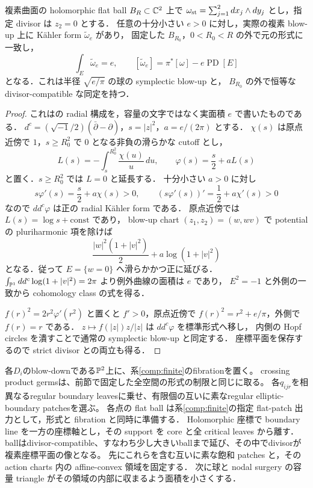 \begin{lemma}
\label{glue:area-normalized-blowup}
複素曲面の holomorphic flat ball $B_R\subset\mathbb C^2$ 上で
$\omega_{\rm st}=\sum_{j=1}^2dx_j\wedge dy_j$ とし，指定 divisor は $z_2=0$ とする．
任意の十分小さい $e>0$ に対し，実際の複素 blow-up 上に K\"ahler form $\widetilde\omega_e$ があり，
固定した $B_{R_0}$，$0<R_0<R$ の外で元の形式に一致し，
\[
 \int_E\widetilde\omega_e=e,\qquad
 [\widetilde\omega_e]=\pi^*[\omega]-e\operatorname{PD}[E]
\]
となる．これは半径 $\sqrt{e/\pi}$ の球の symplectic blow-up と，
$B_{R_0}$ の外で恒等な divisor-compatible な同定を持つ．
\end{lemma}
\begin{proof}
これは\cite[Lemmas 4.4--4.5, Proposition 4.6, Construction 4.7]{Fleming}の
radial 構成を，容量の文字ではなく実面積 $e$ で書いたものである．
$d^c=(\sqrt{-1}/2)(\bar\partial-\partial)$，$s=|z|^2$，$a=e/(2\pi)$ とする．
$\chi(s)$ は原点近傍で $1$，$s\ge R_0^2$ で $0$ となる非負の滑らかな cutoff とし，
\[
 L(s)=-\int_s^{R_0^2}\frac{\chi(u)}u\,du,
 \qquad \varphi(s)=\frac{s}{2}+aL(s)
\]
と置く．$s\ge R_0^2$ では $L=0$ と延長する．
十分小さい $a>0$ に対し
\[
 s\varphi'(s)=\frac{s}{2}+a\chi(s)>0,
 \qquad (s\varphi'(s))'=\frac12+a\chi'(s)>0
\]
なので $dd^c\varphi$ は正の radial K\"ahler form である．
原点近傍では $L(s)=\log s+\text{const}$ であり，
blow-up chart $(z_1,z_2)=(w,wv)$ で potential の pluriharmonic 項を除けば
\[
 \frac{|w|^2(1+|v|^2)}2+a\log(1+|v|^2)
\]
となる．従って $E=\{w=0\}$ へ滑らかかつ正に延びる．
$\int_{\mathbb P^1}dd^c\log(1+|v|^2)=2\pi$ より例外曲線の面積は $e$ であり，
$E^2=-1$ と外側の一致から cohomology class の式を得る．

$f(r)^2=2r^2\varphi'(r^2)$ と置くと $f'>0$，原点近傍で
$f(r)^2=r^2+e/\pi$，外側で $f(r)=r$ である．
$z\mapsto f(|z|)z/|z|$ は $dd^c\varphi$ を標準形式へ移し，
内側の Hopf circles を潰すことで通常の symplectic blow-up と同定する．
座標平面を保存するので strict divisor との両立も得る．
\end{proof}

各$D_i$のblow-downである$\mathbb P^2$上に、系\ref{comp:finite}のfibrationを置く。
crossing product germsは、前節で固定した全空間の形式の制限と同じに取る。
各$q_{ijr}$を相異なるregular boundary leavesに乗せ、有限個の互いに素なregular elliptic-boundary patchesを選ぶ。
各点の flat ball は系\ref{comp:finite}の指定 flat-patch 出力として，形式と fibration と同時に準備する．
Holomorphic 座標で boundary line を一方の座標軸とし，その support を core と全 critical leaves から離す．
ballはdivisor-compatible、すなわち少し大きいballまで延び、その中でdivisorが複素座標平面の像となる。
先にこれらを含む互いに素な飽和 patches と，その action charts 内の affine-convex 領域を固定する．
次に球と nodal surgery の容量 triangle がその領域の内部に収まるよう面積を小さくする．

